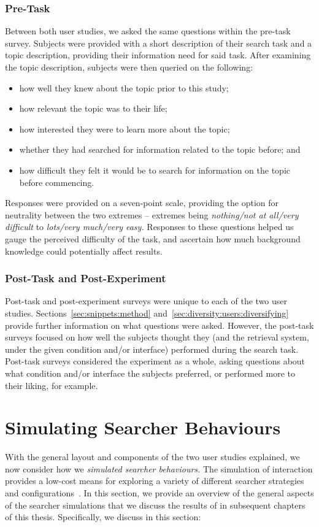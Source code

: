 \subsubsection{Pre-Task}
Between both user studies, we asked the same questions within the pre-task survey. Subjects were provided with a short description of their search task and a topic description, providing their information need for said task. After examining the topic description, subjects were then queried on the following:

\begin{itemize}
    \item{how well they knew about the topic prior to this study;}
    \item{how relevant the topic was to their life;}
    \item{how interested they were to learn more about the topic;}
    \item{whether they had searched for information related to the topic before; and}
    \item{how difficult they felt it would be to search for information on the topic before commencing.}
\end{itemize}

Responses were provided on a seven-point scale, providing the option for neutrality between the two extremes -- extremes being \emph{nothing/not at all/very difficult} to \emph{lots/very much/very easy.} Responses to these questions helped us gauge the perceived difficulty of the task, and ascertain how much background knowledge could potentially affect results.

\subsubsection{Post-Task and Post-Experiment}
Post-task and post-experiment surveys were unique to each of the two user studies. Sections~\ref{sec:snippets:method} and~\ref{sec:diversity:users:diversifying} provide further information on what questions were asked. However, the post-task surveys focused on how well the subjects thought they (and the retrieval system, under the given condition and/or interface) performed during the search task. Post-task surveys considered the experiment as a whole, asking questions about what condition and/or interface the subjects preferred, or performed more to their liking, for example.

\section{Simulating Searcher Behaviours}\label{sec:method:simulation}
With the general layout and components of the two user studies explained, we now consider how we \emph{simulated searcher behaviours.} The simulation of interaction provides a low-cost means for exploring a variety of different searcher strategies and configurations~\citep{azzopardi2010workshop}. In this section, we provide an overview of the general aspects of the  searcher simulations that we discuss the results of in subsequent chapters of this thesis. Specifically, we discuss in this section:

